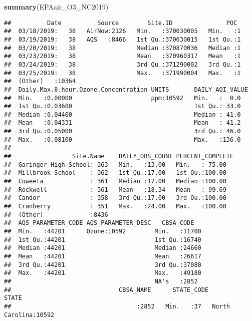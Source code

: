 \documentclass[]{article}
\newenvironment{Shaded}{\begin{snugshade}}{\end{snugshade}}
\newcommand{\KeywordTok}[1]{\textcolor[rgb]{0.13,0.29,0.53}{\textbf{#1}}}
\newcommand{\NormalTok}[1]{#1}
\begin{document}
\begin{Shaded}
\begin{Highlighting}[]
\KeywordTok{summary}\NormalTok{(EPAair_O3_NC2019)}
\end{Highlighting}
\end{Shaded}

\begin{verbatim}
##          Date          Source        Site.ID               POC   
##  03/18/2019:   38   AirNow:2126   Min.   :370030005   Min.   :1  
##  03/19/2019:   38   AQS   :8466   1st Qu.:370630015   1st Qu.:1  
##  03/20/2019:   38                 Median :370870036   Median :1  
##  03/23/2019:   38                 Mean   :370960317   Mean   :1  
##  03/24/2019:   38                 3rd Qu.:371290002   3rd Qu.:1  
##  03/25/2019:   38                 Max.   :371990004   Max.   :1  
##  (Other)   :10364                                                
##  Daily.Max.8.hour.Ozone.Concentration UNITS       DAILY_AQI_VALUE
##  Min.   :0.00000                      ppm:10592   Min.   :  0.0  
##  1st Qu.:0.03600                                  1st Qu.: 33.0  
##  Median :0.04400                                  Median : 41.0  
##  Mean   :0.04331                                  Mean   : 41.2  
##  3rd Qu.:0.05000                                  3rd Qu.: 46.0  
##  Max.   :0.08100                                  Max.   :136.0  
##                                                                  
##                 Site.Name    DAILY_OBS_COUNT PERCENT_COMPLETE
##  Garinger High School: 363   Min.   :13.00   Min.   : 75.00  
##  Millbrook School    : 362   1st Qu.:17.00   1st Qu.:100.00  
##  Coweeta             : 361   Median :17.00   Median :100.00  
##  Rockwell            : 361   Mean   :18.34   Mean   : 99.69  
##  Candor              : 358   3rd Qu.:17.00   3rd Qu.:100.00  
##  Cranberry           : 351   Max.   :24.00   Max.   :100.00  
##  (Other)             :8436                                   
##  AQS_PARAMETER_CODE AQS_PARAMETER_DESC   CBSA_CODE    
##  Min.   :44201      Ozone:10592        Min.   :11700  
##  1st Qu.:44201                         1st Qu.:16740  
##  Median :44201                         Median :24660  
##  Mean   :44201                         Mean   :26617  
##  3rd Qu.:44201                         3rd Qu.:37080  
##  Max.   :44201                         Max.   :49180  
##                                        NA's   :2852   
##                              CBSA_NAME      STATE_CODE            STATE      
##                                   :2852   Min.   :37   North Carolina:10592  

\end{verbatim}
\end{document}
